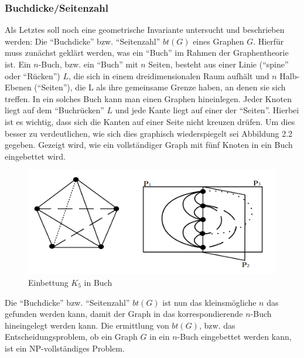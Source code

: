 \documentclass[a4paper,12pt,ngerman,chapterprefix=false,listof=totoc,bibliography=totoc]{scrreprt}
\begin{document}
{\subsubsection*{Buchdicke/Seitenzahl}
{
Als Letztes soll noch eine geometrische Invariante untersucht und beschrieben werden: Die "`Buchdicke"' bzw. "`Seitenzahl"' \(bt(G)\) eines Graphen \(G\). Hierfür muss zunächst geklärt werden, was ein "`Buch"' im Rahmen der Graphentheorie ist. Ein \(n\)-Buch, bzw. ein "`Buch"' mit \(n\) Seiten, besteht aus einer Linie ("`spine"' oder "`Rücken"') \(L\), die sich in einem dreidimensionalen Raum aufhält und \(n\) Halb-Ebenen ("`Seiten"'), die L als ihre gemeinsame Grenze haben, an denen sie sich treffen. In ein solches Buch kann man einen Graphen hineinlegen. Jeder Knoten liegt auf dem "`Buchrücken"' \(L\) und jede Kante liegt auf einer der "`Seiten"'. Hierbei ist es wichtig, dass sich die Kanten auf einer Seite nicht kreuzen drüfen. Um dies besser zu verdeutlichen, wie sich dies graphisch wiederspiegelt sei Abbildung 2.2 gegeben. Gezeigt wird, wie ein vollständiger Graph mit fünf Knoten in ein Buch eingebettet wird.
\begin{figure}[ht!]
	\centering
	\includegraphics[scale=0.4]{Abbildungen/graph_book.png}
	\caption[Einbettung \(K_5\) in Buch \cite{blankenship_book_2003}]{Einbettung \(K_5\) in Buch \cite{blankenship_book_2003}}
\end{figure}
Die "`Buchdicke"' bzw. "`Seitenzahl"' \(bt(G)\) ist nun das kleinsmögliche \(n\) das gefunden werden kann, damit der Graph in das korrespondierende \(n\)-Buch hineingelegt werden kann. \cite{bernhart_book_1979} Die ermittlung von \(bt(G)\), bzw. das Entscheidungsproblem, ob ein Graph \(G\) in ein \(n\)-Buch eingebettet werden kann, ist ein NP-vollständiges Problem. \cite{chung_embedding_1987}

}}
\end{document}
